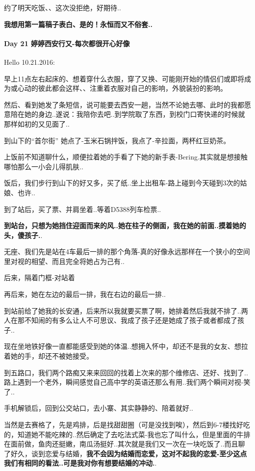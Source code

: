 \documentclass[UTF8,a4paper,8pt]{ctexbook}
\begin{document}
		 约了明天吃饭、、这次没拒绝，好期待..
		 
		 \textbf{我想用第一篇稿子表白、是的！永恒而又不俗套..}
		 
 	 \paragraph{Day 21  婷婷西安行又-每次都很开心好像    \quad     }
	 	 Hello 10.21.2016:
	 	 
	 	 早上11点左右起床的、想着穿什么衣服，穿了又换、可能刚开始的情侣们或即将成为或心动的彼此都会这样、、注重着衣服对自己的影响，外貌装扮的影响。
	 	 
	 	 然后、看到她发了条短信，说可能要去西安一趟，当然不论她去哪、此时的我都愿意陪在她的身边..遂说：我陪你去吧..到学院取了东西，到校门口寄快递的时候就那样如初的又见面了..
	 	 
	 	 到山下的“首尔街” 她点了-玉米石锅拌饭，我点了-辛拉面，两杯红豆奶茶。
	 	 
	 	 上饭前不知道聊什么，顺便拉着她的手看了下她的新手表-Bering.其实就是想接触哪怕那么一小会儿得肌肤..
	 	 
	 	 饭后，我们步行到山下的好又多，买了纸..坐上出租车-路上碰到今天碰到3次的姑娘、也许..
	 	 
	 	 到了站后，买了票、并肩坐着..等着D5388列车检票..
	 	 
	 	 \textbf{到站台，只想为她挡住迎面而来的风..她在柱子的侧面，我在她的前面..摸着她的头，傻孩子.}.
	 	 
	 	 无座、我们先是站在4车最后一排的那个角落-真的好像永远那样在一个狭小的空间里对视的相望、而且完全将她占为己有..
	 	 
	 	 后来，隔着门框-对站着
	 	 
	 	 再后来，她在左边的最后一排，我在右边的最后一排..
	 	 
	 	 到站前给了她我的长安通，后来所以我就要买票了啊，她排着然后我就不排了..两人在那不知闹的有多么让人不可思议、我成了孩子还是她成了孩子或者都成了孩子..
	 	 
	 	 现在坐地铁好像一直都能感受到她的体温..想拥入怀中，却还不是我的女友、想拉着她的手，却还不被她接受。
	 	 
	 	 到五路口，我们两个路痴又来来回回的找着上次来的那个维修店、还好、找到了..路上遇到一个老外，瞬间感觉自己高中学的英语还那么有用..我们两个瞬间对视-笑了..
	 	 
	 	 手机解锁后，回到公交站口，去小寨、其实静静的、陪着就好..
	 	 
	 	 当然是去赛格了，先是鸡排，后是找甜甜圈（可是没找到唉），然后到6-7楼找好吃的，知道她不能吃辣的..然后确定了去吃法式菜-我也忘了叫什么，但是里面的牛排在面前做，鱼肉还挺嫩，南瓜汤挺好..其次就是我们又一次在一块吃饭了..而且聊了好久，谈到恋爱与结婚，\textbf{我不会因为结婚而恋爱，这对不起我的恋爱-至少这点我们有相同的看法..可是我对你有想要结婚的冲动.}.
	 	 
\end{document}
